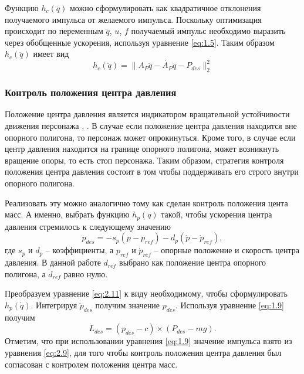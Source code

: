 Функцию $h_c(\ddot{q})$ можно сформулировать как квадратичное отклонения получаемого импульса от желаемого импульса. Поскольку оптимизация происходит по переменным $\ddot{q}$, $u$, $f$ получаемый импульс необходимо выразить через обобщенные ускорения, используя уравнение \ref{eq:1.5}. Таким образом $h_c(\ddot{q})$ имеет вид
\begin{equation*}
  h_{c}(\ddot{q}) = \lVert A_{P}\ddot{q} - \dot{A_{P}} \dot{q} - P_{des} \rVert_{2}^{2} \tag{2.10}\label{eq:2.10}
\end{equation*}

\subsubsection{Контроль положения центра давления}

Положение центра давления является индикатором вращательной устойчивости движения персонажа \cite{MacchiettoZS}, \cite{GoswamiK}. В случае если положение центра давления находится вне опорного полигона, то персонаж может опрокинуться. Кроме того, в случае если центр давления находится на границе опорного полигона, может возникнуть вращение опоры, то есть стоп персонажа. Таким образом, стратегия контроля положения центра давления состоит в том чтобы поддерживать его строго внутри опорного полигона.

Реализовать эту можно аналогично тому как сделан контроль положения цента масс. А именно, выбрать функцию $h_{p}(\ddot{q})$ такой, чтобы ускорения центра давления стремилось к следующему значению
\begin{equation*}
  \ddot{p}_{des} = - s_{p} (p - p_{ref}) - d_{p} (\dot{p} - \dot{p}_{ref}), \tag{2.11}\label{eq:2.11}
\end{equation*}
где $s_{p}$ и $d_{p}$ -- коэффициенты, а $p_{ref}$ и $\dot{p}_{ref}$ -- опорные положение и скорость центра давления. В данной работе $d_{ref}$ выбрано как положение центра опорного полигона, а $\dot{d}_{ref}$ равно нулю.

Преобразуем уравнение \ref{eq:2.11} к виду необходимому, чтобы сформулировать $h_p(\dot{q})$. Интегрируя $\ddot{p}_{des}$ получим значение $p_{des}$. Используя уравнение \ref{eq:1.9} получим
\begin{equation*}
  \dot{L}_{des} = (p_{des} - c) \times (P_{des} - mg). \tag{2.12}\label{eq:2.12}
\end{equation*}
Отметим, что при использовании уравнения \ref{eq:1.9} значение импульса взято из уравнения \ref{eq:2.9}, для того чтобы контроль положения центра давления был согласован с контролем положения центра масс.

